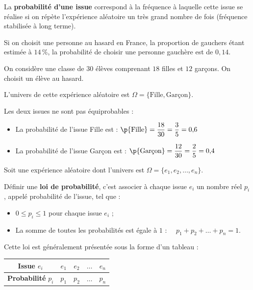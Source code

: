 \begin{defin}
	La \textbf{probabilité d'une issue} correspond à la fréquence à laquelle cette issue se réalise si on répète l'expérience aléatoire un très grand nombre de fois (fréquence stabilisée à long terme).
\end{defin}

\begin{ex}
	Si on choisit une personne au hasard en France, la proportion de gauchers étant estimée à $14\,\%$, la probabilité de choisir une personne gauchère est de $0,14$.
\end{ex}

\begin{ex}
	On considère une classe de $30$ élèves comprenant $18$ filles et $12$ garçons. On choisit un élève au hasard.

	L'univers de cette expérience aléatoire est $\Omega = \{\text{Fille}, \text{Garçon}\}$.

	Les deux issues ne sont pas équiprobables :

	\begin{itemize}
		\item La probabilité de l'issue \og Fille\fg{} est : $\p{\text{Fille}} = \dfrac{18}{30} = \dfrac{3}{5} = 0{,}6$
		\item La probabilité de l'issue \og Garçon\fg{} est : $\p{\text{Garçon}} = \dfrac{12}{30} = \dfrac{2}{5} = 0{,}4$
	\end{itemize}
\end{ex}

\begin{defin}
	Soit une expérience aléatoire dont l'univers est $\Omega = \{e_1, e_2, \dots, e_n\}$.

	Définir une \textbf{loi de probabilité}, c'est associer à chaque issue $e_i$ un nombre réel $p_i$, appelé probabilité de l'issue, tel que :

	\begin{itemize}
		\item $0 \leqslant p_i \leqslant 1$ pour chaque issue $e_i$ ;
		\item La somme de toutes les probabilités est égale à $1$ : $\quad p_1 + p_2 + \dots + p_n = 1$.
	\end{itemize}
\end{defin}

\newpage

\begin{rem}
	Cette loi est généralement présentée sous la forme d'un tableau :

	\begin{center}
		\begin{tabular}{|c|c|c|c|c|} \hline
			\textbf{Issue} $e_i$       & $e_1$ & $e_2$ & $\dots$ & $e_n$ \\ \hline
			\textbf{Probabilité} $p_i$ & $p_1$ & $p_2$ & $\dots$ & $p_n$ \\ \hline
		\end{tabular}
	\end{center}
\end{rem}


